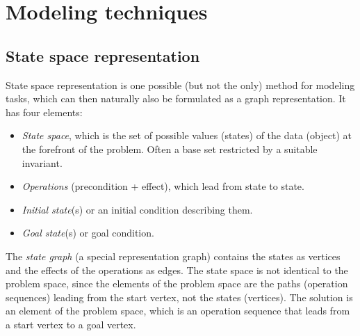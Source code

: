 \documentclass[margin=0px]{article}
\begin{document}
\section{Modeling techniques}
\subsection{State space representation}

State space representation is one possible (but not the only) method for modeling tasks, which can then naturally also be formulated as a graph representation. It has four elements:
\begin{itemize}
    \item \textit{State space}, which is the set of possible values (states) of the data (object) at the forefront of the problem. Often a base set restricted by a suitable invariant.
    \item \textit{Operations} (precondition + effect), which lead from state to state.
    \item \textit{Initial state}(s) or an initial condition describing them.
    \item \textit{Goal state}(s) or goal condition.
\end{itemize}
The \textit{state graph} (a special representation graph) contains the states as vertices and the effects of the operations as edges.
The state space is not identical to the problem space, since the elements of the problem space are the paths (operation sequences) leading from the start vertex, not the states (vertices). The solution is an element of the problem space, which is an operation sequence that leads from a start vertex to a goal vertex.
\end{document}
